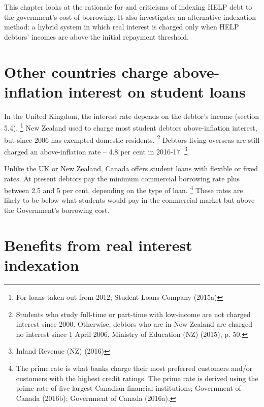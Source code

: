 \documentclass[embargoed]{grattan}
\begin{document}
This chapter looks at the rationale for and criticisms of indexing HELP debt to the government's cost of borrowing.
It also investigates an alternative indexation method: a hybrid system in which real interest is charged only when HELP debtors' incomes are above the initial repayment threshold.

\section{Other countries charge above-inflation interest on student loans}\label{other-countries-charge-above-inflation-interest-on-student-loans}

In the United Kingdom, the interest rate depends on the debtor's income (section 5.4).%
\footnote{For loans taken out from 2012; Student Loans Company (2015a)} New Zealand used to charge most student debtors above-inflation interest, but since 2006 has exempted domestic residents.%
\footnote{Students who study full-time or part-time with low-income are not charged interest since 2000.
Otherwise, debtors who are in New Zealand are charged no interest since 1 April 2006, Ministry of Education (NZ) (2015), p. 50.} Debtors living overseas are still charged an above-inflation rate -- 4.8 per cent in 2016-17.%
\footnote{Inland Revenue (NZ) (2016)}

Unlike the UK or New Zealand, Canada offers student loans with flexible or fixed rates.
At present debtors pay the minimum commercial borrowing rate plus between 2.5 and 5 per cent, depending on the type of loan.%
\footnote{The prime rate is what banks charge their most preferred customers and/or customers with the highest credit ratings.
The prime rate is derived using the prime rate of five largest Canadian financial institutions; Government of Canada (2016b); Government of Canada (2016a).} These rates are likely to be below what students would pay in the commercial market but above the Government's borrowing cost.

\section{Benefits from real interest indexation}\label{benefits-from-real-interest-indexation}
\end{document}
